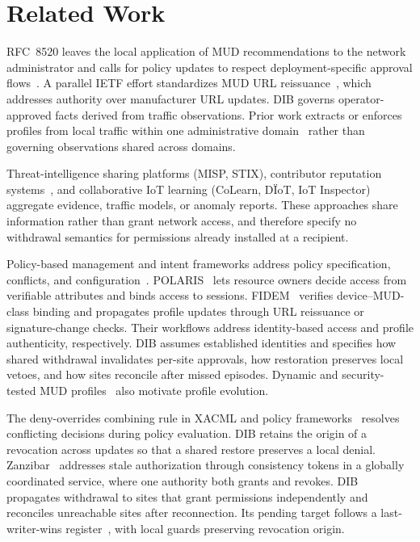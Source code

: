 \documentclass[journal]{IEEEtran}
\theoremstyle{definition}
\begin{document}
\section{Related Work}
\label{sec:related-work}

RFC~8520 leaves the local application of MUD recommendations to the network administrator and calls for policy updates to respect deployment-specific approval flows~\cite[Secs.~1.1 and~1.8]{rfc8520}. A parallel IETF effort standardizes MUD URL reissuance~\cite{mudacceptableurls}, which addresses authority over manufacturer URL updates. DIB governs operator-approved facts derived from traffic observations. Prior work extracts or enforces profiles from local traffic within one administrative domain~\cite{clearasmud, hamzatdsc, mudflow, CornoMannella2023GatewayMUD, osmud, mudscope} rather than governing observations shared across domains.

Threat-intelligence sharing platforms (MISP, STIX), contributor reputation systems~\cite{wagner2016misp, stix21, eigentrust, trustsurvey}, and collaborative IoT learning (CoLearn, D\"IoT, IoT Inspector)~\cite{colearn,ndiot2019, iotinspector, vasilomanolakis2015collaborative} aggregate evidence, traffic models, or anomaly reports. These approaches share information rather than grant network access, and therefore specify no withdrawal semantics for permissions already installed at a recipient.

Policy-based management and intent frameworks address policy specification, conflicts, and configuration~\cite{pbnm,rfc9315,alshaer2004firewall,chowdhary2022intent,pipeconf2022,vergutz2023data}. POLARIS~\cite{polaris} lets resource owners decide access from verifiable attributes and binds access to sessions. FIDEM~\cite{fidem} verifies device--MUD-class binding and propagates profile updates through URL reissuance or signature-change checks. Their workflows address identity-based access and profile authenticity, respectively. DIB assumes established identities and specifies how shared withdrawal invalidates per-site approvals, how restoration preserves local vetoes, and how sites reconcile after missed episodes. Dynamic and security-tested MUD profiles~\cite{blockchainmud,matheu2019mudtesting} also motivate profile evolution.

The deny-overrides combining rule in XACML and policy frameworks~\cite{xacml3, ponder} resolves conflicting decisions during policy evaluation. DIB retains the origin of a revocation across updates so that a shared restore preserves a local denial. Zanzibar~\cite{zanzibar} addresses stale authorization through consistency tokens in a globally coordinated service, where one authority both grants and revokes. DIB propagates withdrawal to sites that grant permissions independently and reconciles unreachable sites after reconnection. Its pending target follows a last-writer-wins register~\cite{crdt}, with local guards preserving revocation origin.
\end{document}
